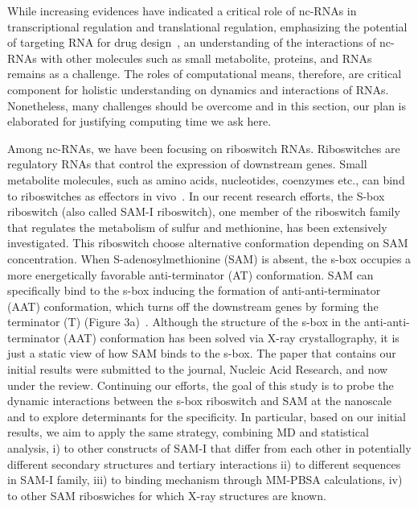 \documentclass[a4paper,10pt]{article}
\begin{document}

While increasing evidences have indicated a critical role of nc-RNAs in transcriptional regulation and
translational regulation, emphasizing the potential of targeting RNA for drug
design~\cite{foloppe}, an understanding of the interactions of nc-RNAs with other molecules such as small metabolite, proteins, and RNAs remains as a challenge.  The roles of computational means, therefore, are critical component for holistic understanding on dynamics and interactions of RNAs.  Nonetheless, many challenges should be overcome and in this section, our plan is elaborated for justifying computing time we ask here.

Among nc-RNAs, we have been focusing on riboswitch RNAs. Riboswitches are regulatory RNAs that control the expression of downstream genes. Small metabolite 
molecules, such as amino acids, nucleotides, coenzymes etc., can bind to riboswitches as effectors in  vivo~\cite{mandal}. 
In our recent research efforts, the S-box riboswitch (also called SAM-I riboswitch), one member of the riboswitch family that
regulates the metabolism of sulfur and methionine, has been extensively investigated.  This riboswitch choose alternative conformation depending on SAM concentration.  When S-adenosylmethionine (SAM) is absent, the
s-box occupies a more energetically favorable anti-terminator (AT) conformation. SAM can
specifically bind to the s-box inducing the formation of anti-anti-terminator (AAT) conformation,
which turns off the downstream genes by forming the terminator (T) (Figure 3a)~\cite{brooke}. Although the 
structure of the s-box in the anti-anti-terminator (AAT) conformation has been solved via X-ray 
crystallography, it is just a static view of how SAM binds to the s-box.  The paper that contains our initial results were submitted to the journal, Nucleic Acid Research, and now under the review.  Continuing our efforts, the goal of this study is to probe 
the dynamic interactions between the s-box riboswitch and SAM at the nanoscale and to explore 
determinants for the specificity. In particular, based on our initial results, we aim to apply the same strategy, combining MD and statistical analysis, i) to other constructs of SAM-I that differ from each other in potentially different secondary structures and tertiary interactions ii) to different sequences in SAM-I family, iii) to binding mechanism through MM-PBSA calculations, iv) to other SAM riboswiches for which X-ray structures are known.   
\end{document}

